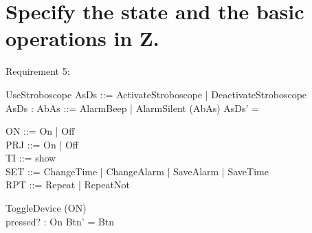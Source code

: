 \documentclass[Main_Assignment2]{subfiles}
\begin{document}
\section{Specify the state and the basic operations in Z.}

Requirement 5:
\begin{schema}{UseStroboscope}
AsDs ::= ActivateStroboscope | DeactivateStroboscope \\
AsDs :
AbAs ::= AlarmBeep | AlarmSilent
\Delta (AbAs)
\where
AsDs' = 
\end{schema}

\begin{schema}{}
ON ::= On | Off  \\
PRJ ::= On | Off \\
TI ::= show  \\
SET ::= ChangeTime | ChangeAlarm | SaveAlarm | SaveTime \\
RPT ::= Repeat | RepeatNot
\end{schema}

\begin{schema}{ToggleDevice}
\Delta (ON) \\
pressed? : On
\where
Btn' = Btn 
\end{schema}
\end{document}
